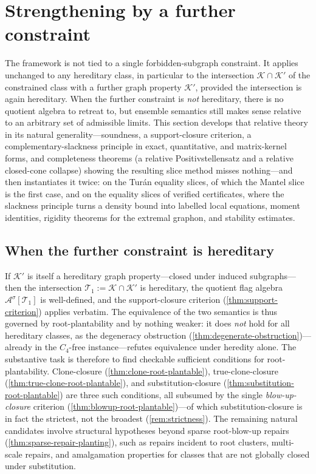 \documentclass[11pt]{article}
\theoremstyle{definition}
\newcommand{\A}{\mathcal{A}}
\newcommand{\K}{\mathcal{K}}
\newcommand{\T}{\mathcal{T}}
\begin{document}
\section{Strengthening by a further constraint}

The framework is not tied to a single forbidden-subgraph constraint.  It applies
unchanged to any hereditary class, in particular to the intersection $\K\cap\K'$ of the
constrained class with a further graph property $\K'$, provided the intersection is again
hereditary.  When the further constraint is \emph{not} hereditary, there is no quotient
algebra to retreat to, but ensemble semantics still makes sense relative to an arbitrary
set of admissible limits.  This section develops that relative theory in its natural
generality---soundness, a support-closure criterion, a complementary-slackness
principle in exact, quantitative, and matrix-kernel forms, and completeness theorems
(a relative Positivstellensatz and a relative closed-cone collapse) showing the
resulting slice method misses nothing---and then instantiates it twice: on the
Tur\'an equality slices, of which the Mantel slice is the first case, and on the equality
slices of verified certificates, where the slackness principle turns a density bound into
labelled local equations, moment identities, rigidity theorems for the extremal graphon,
and stability estimates.

\subsection{When the further constraint is hereditary}

If $\K'$ is itself a hereditary graph property---closed under induced subgraphs---then the
intersection $\T_1:=\K\cap\K'$ is hereditary, the quotient flag algebra $\A^\sigma[\T_1]$
is well-defined, and the support-closure criterion (\cref{thm:support-criterion}) applies
verbatim.  The equivalence of the two semantics is thus governed by root-plantability and
by nothing weaker: it does \emph{not} hold for all hereditary classes, as the degeneracy
obstruction (\cref{thm:degenerate-obstruction})---already in the $C_4$-free
instance---refutes equivalence under heredity alone.  The substantive task is therefore
to find checkable sufficient conditions for root-plantability.  Clone-closure
(\cref{thm:clone-root-plantable}), true-clone-closure (\cref{thm:true-clone-root-plantable}),
and substitution-closure (\cref{thm:substitution-root-plantable}) are three such
conditions, all subsumed by the single \emph{blow-up-closure} criterion
(\cref{thm:blowup-root-plantable})---of which substitution-closure is in fact the strictest,
not the broadest (\cref{rem:strictness}).  The remaining natural candidates involve
structural hypotheses beyond sparse root-blow-up repairs
(\cref{thm:sparse-repair-planting}), such as repairs incident to root clusters,
multi-scale repairs, and amalgamation properties for classes that are not globally
closed under substitution.
\end{document}
